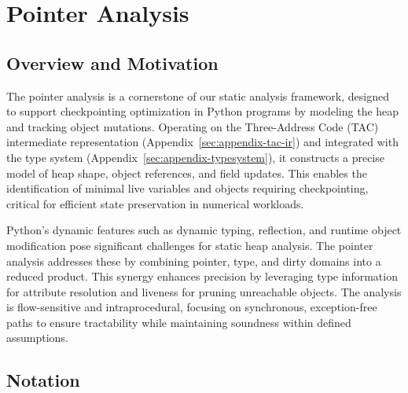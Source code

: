 \newpage

\section{Pointer Analysis}
\label{sec:appendix-pointer}

\subsection{Overview and Motivation}

The pointer analysis is a cornerstone of our static analysis framework, designed to support checkpointing optimization in Python programs by modeling the heap and tracking object mutations. Operating on the Three-Address Code (TAC) intermediate representation (Appendix~\ref{sec:appendix-tac-ir}) and integrated with the type system (Appendix~\ref{sec:appendix-typesystem}), it constructs a precise model of heap shape, object references, and field updates. This enables the identification of minimal live variables and objects requiring checkpointing, critical for efficient state preservation in numerical workloads.

Python’s dynamic features such as dynamic typing, reflection, and runtime object modification pose significant challenges for static heap analysis. The pointer analysis addresses these by combining pointer, type, and dirty domains into a reduced product. This synergy enhances precision by leveraging type information for attribute resolution and liveness for pruning unreachable objects. The analysis is flow-sensitive and intraprocedural, focusing on synchronous, exception-free paths to ensure tractability while maintaining soundness within defined assumptions.

\subsection{Notation}

